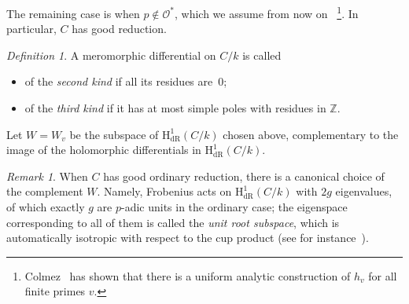 \documentclass[11pt, a4paper]{amsart}
\renewcommand{\O}{\mathcal{O}}
\newcommand{\hdr}{\operatorname{H^1_{dR}}}
\newcommand{\hdrh}{\operatorname{H^{1,0}_{dR}}}
\renewcommand{\O}{\mathcal{O}}
\theoremstyle{remark}
\newtheorem{remark}[theorem]{Remark}
\newtheorem{definition}[theorem]{Definition}
\numberwithin{equation}{section}
\newcommand{\sg}{{}}
\newcommand{\sm}{{}}
\begin{document}
The remaining case is when $p\notin\O^\ast$, which we assume from now on
~\footnote{Colmez~\cite{Col98} has shown that there is a uniform
analytic
construction of $h_v$ for all finite primes $v$.}. In particular, $C$ has good reduction.
\begin{definition}\label{diffdef}
A meromorphic differential on $C/k$ is called 
  \begin{itemize}
    \item of the \textit{second kind} if all its residues are~0;
    \item of the \textit{third kind} if it has at most simple poles with residues in $\mathbb{Z}$.
  \end{itemize}
\end{definition}
Let $W=W_v$ be the subspace of $\hdr(C/k)$ chosen above, complementary to
\sm{the image of the holomorphic differentials in $\hdr(C/k)$.}
 
\begin{remark}\label{rmk:W-Unit-Root}
When $C$ has good ordinary reduction, there is a canonical choice of
  the complement $W$. Namely, Frobenius acts on $\hdr(C/k)$ with $2g$
  eigenvalues, of which exactly $g$ are $p$-adic units in the ordinary
  case; the eigenspace corresponding to all of them is called the  {\it
  unit root subspace}, which is automatically  isotropic with respect to
  the cup product \sm{(see for instance~\cite[Theorem~3.1]{Iov00})}.
\end{remark}
\end{document}
